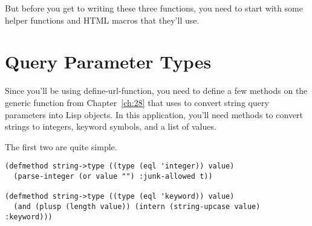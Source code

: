 But before you get to writing these three functions, you need to start with some helper
functions and HTML macros that they'll use.

\section{Query Parameter Types}

Since you'll be using define-url-function, you need to define a few methods on the
 generic function from Chapter~\ref{ch:28} that
 uses to convert string query parameters into Lisp objects. In
this application, you'll need methods to convert strings to integers, keyword symbols, and
a list of values.

The first two are quite simple.

\begin{lstlisting}
(defmethod string->type ((type (eql 'integer)) value)
  (parse-integer (or value "") :junk-allowed t))

(defmethod string->type ((type (eql 'keyword)) value)
  (and (plusp (length value)) (intern (string-upcase value) :keyword)))
\end{lstlisting}

